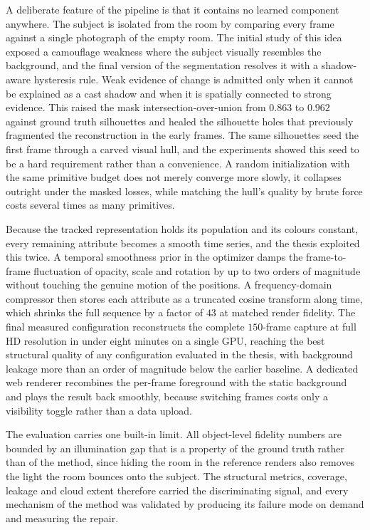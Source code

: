 A deliberate feature of the pipeline is that it contains no learned component
anywhere. The subject is isolated from the room by comparing every frame against a
single photograph of the empty room. The initial study of this idea exposed a
camouflage weakness where the subject visually resembles the background, and the
final version of the segmentation resolves it with a shadow-aware hysteresis rule.
Weak evidence of change is admitted only when it cannot be explained as a cast
shadow and when it is spatially connected to strong evidence. This raised the mask
intersection-over-union from $0.863$ to $0.962$ against ground truth silhouettes
and healed the silhouette holes that previously fragmented the reconstruction in
the early frames. The same silhouettes seed the first frame through a carved visual
hull, and the experiments showed this seed to be a hard requirement rather than a
convenience. A random initialization with the same primitive budget does not merely
converge more slowly, it collapses outright under the masked losses, while matching
the hull's quality by brute force costs several times as many primitives.

Because the tracked representation holds its population and its colours constant,
every remaining attribute becomes a smooth time series, and the thesis exploited
this twice. A temporal smoothness prior in the optimizer damps the frame-to-frame
fluctuation of opacity, scale and rotation by up to two orders of magnitude without
touching the genuine motion of the positions. A frequency-domain compressor then
stores each attribute as a truncated cosine transform along time, which shrinks the
full sequence by a factor of $43$ at matched render fidelity. The final measured
configuration reconstructs the complete $150$-frame capture at full HD resolution
in under eight minutes on a single GPU, reaching the best structural quality of any
configuration evaluated in the thesis, with background leakage more than an order
of magnitude below the earlier baseline. A dedicated web renderer recombines the
per-frame foreground with the static background and plays the result back smoothly,
because switching frames costs only a visibility toggle rather than a data upload.

The evaluation carries one built-in limit. All object-level
fidelity numbers are bounded by an illumination gap that is a property of the
ground truth rather than of the method, since hiding the room in the reference
renders also removes the light the room bounces onto the subject. The structural
metrics, coverage, leakage and cloud extent therefore carried the discriminating
signal, and every mechanism of the method was validated by producing its failure
mode on demand and measuring the repair.

